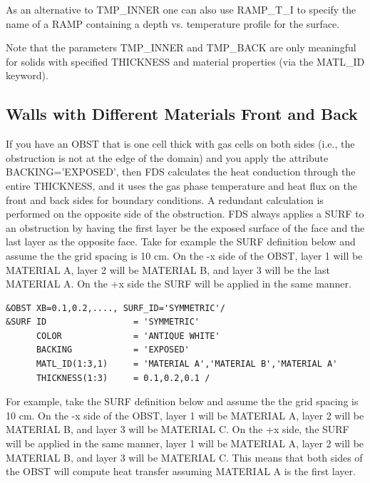 \documentclass[11pt]{book}
\begin{document}
As an alternative to {\ct TMP\_INNER} one can also use {\ct RAMP\_T\_I} to specify the name of a {\ct RAMP} containing a depth vs. temperature profile for the surface.

Note that the parameters {\ct TMP\_INNER} and {\ct TMP\_BACK} are only meaningful for solids with specified {\ct THICKNESS} and material
properties (via the {\ct MATL\_ID} keyword).




\subsection{Walls with Different Materials Front and Back}
\label{info:EXPOSED}

If you have an {\ct OBST} that is one cell thick with gas cells on both sides (i.e., the obstruction is not at the edge of the domain) and you apply the attribute {\ct BACKING='EXPOSED'}, then FDS calculates the heat conduction through the entire {\ct THICKNESS}, and it uses the gas phase temperature and heat flux on the front and back sides for boundary conditions. A redundant calculation is performed on the opposite side of the obstruction.  FDS always applies a {\ct SURF} to an obstruction by having the first layer be the exposed surface of the face and the last layer as the opposite face.  Take for example the {\ct SURF} definition below and assume the the grid spacing is 10 cm.  On the -x side of the {\ct OBST}, layer 1 will be {\ct MATERIAL A}, layer 2 will be {\ct MATERIAL B}, and layer 3 will be the last {\ct MATERIAL A}.  On the +x side the {\ct SURF} will be applied in the same manner.

\begin{lstlisting}
&OBST XB=0.1,0.2,...., SURF_ID='SYMMETRIC'/
&SURF ID                 = 'SYMMETRIC'
      COLOR              = 'ANTIQUE WHITE'
      BACKING            = 'EXPOSED'
      MATL_ID(1:3,1)     = 'MATERIAL A','MATERIAL B','MATERIAL A'
      THICKNESS(1:3)     = 0.1,0.2,0.1 /
\end{lstlisting}

For example, take the {\ct SURF} definition below and assume the the grid spacing is 10 cm.  On the -x side of the {\ct OBST}, layer 1 will be {\ct MATERIAL A}, layer 2 will be {\ct MATERIAL B}, and layer 3 will be {\ct MATERIAL C}.  On the +x side, the {\ct SURF} will be applied in the same manner, layer 1 will be {\ct MATERIAL A}, layer 2 will be {\ct MATERIAL B}, and layer 3 will be {\ct MATERIAL C}.  This means that both sides of the {\ct OBST} will compute heat transfer assuming {\ct MATERIAL A} is the first layer.
\end{document}
